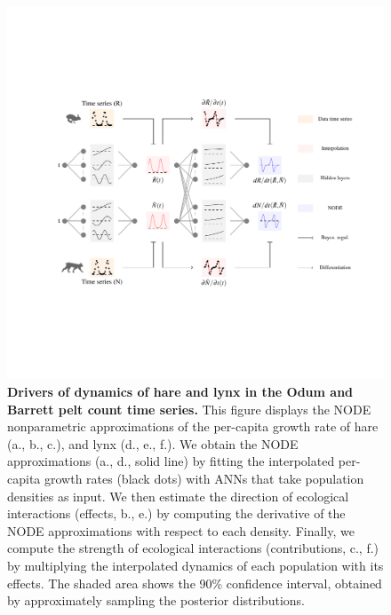 \documentclass[11pt, oneside]{article}
\begin{document}
\newpage
\begin{figure}[H]
\includegraphics[width=1\linewidth,page=18]{figures/main.pdf}
\caption{
    \textbf{Drivers of dynamics of hare and lynx in the Odum and Barrett pelt count time series.}
    This figure displays the NODE nonparametric approximations of the per-capita growth rate of hare (a., b., c.), and lynx (d., e., f.).
    We obtain the NODE approximations (a., d., solid line) by fitting the interpolated per-capita growth rates (black dots) with ANNs that take population densities as input.
    We then estimate the direction of ecological interactions (effects, b., e.) by computing the derivative of the NODE approximations with respect to each density.
    Finally, we compute the strength of ecological interactions (contributions, c., f.) by multiplying the interpolated dynamics of each population with its effects.
    The shaded area shows the 90\% confidence interval, obtained by approximately sampling the posterior distributions. 
}
\end{figure}
\newpage
\end{document}
